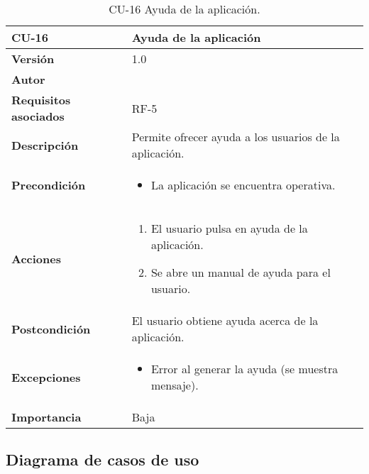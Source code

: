\begin{table}[p]
	\centering
	\begin{tabularx}{\linewidth}{ p{} p{} }
		\toprule
		\textbf{CU-16}    & \textbf{ Ayuda de la aplicación}\\
		\toprule
		\textbf{Versión}              & 1.0    \\
		\textbf{Autor}                & \@author{} \\
		\textbf{Requisitos asociados} & RF-5\\
		\textbf{Descripción}          & Permite ofrecer ayuda a los usuarios de la aplicación. \\
		\textbf{Precondición}         &
		\begin{itemize}
			\tightlist
			\item La aplicación se encuentra operativa.
		\end{itemize}\\
		\textbf{Acciones}             &
		\begin{enumerate}
			\tightlist
			\item El usuario pulsa en ayuda de la aplicación.
			\item Se abre un manual de ayuda para el usuario.
		\end{enumerate}\\
		\textbf{Postcondición}        & El usuario obtiene ayuda acerca de la aplicación.\\
		\textbf{Excepciones}          &
		\begin{itemize}
			\tightlist
			\item Error al generar la ayuda (se muestra mensaje).
		\end{itemize}\\
		\textbf{Importancia}          & Baja\\
		\bottomrule
	\end{tabularx}
	\caption{CU-16 Ayuda de la aplicación.}\label{tab:table-16}
\end{table}

\begin{landscape}
	\subsection{Diagrama de casos de uso}\label{subsec:diagrama-de-casos-de-uso}
\end{landscape}